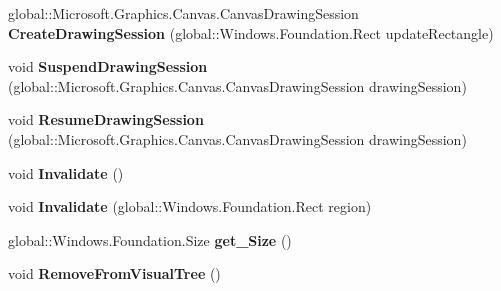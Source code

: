 \begin{DoxyCompactItemize}
global\+::\+Microsoft.\+Graphics.\+Canvas.\+Canvas\+Drawing\+Session {\bfseries Create\+Drawing\+Session} (global\+::\+Windows.\+Foundation.\+Rect update\+Rectangle)
\item 
\mbox{\label{class_microsoft_1_1_graphics_1_1_canvas_1_1_u_i_1_1_xaml_1_1_canvas_virtual_control_a67b34bbbcf4601ef850f26c26a0c3f54}} 
void {\bfseries Suspend\+Drawing\+Session} (global\+::\+Microsoft.\+Graphics.\+Canvas.\+Canvas\+Drawing\+Session drawing\+Session)
\item 
\mbox{\label{class_microsoft_1_1_graphics_1_1_canvas_1_1_u_i_1_1_xaml_1_1_canvas_virtual_control_a48ffbfafcaa20c4de29aee9bdec37dbd}} 
void {\bfseries Resume\+Drawing\+Session} (global\+::\+Microsoft.\+Graphics.\+Canvas.\+Canvas\+Drawing\+Session drawing\+Session)
\item 
\mbox{\label{class_microsoft_1_1_graphics_1_1_canvas_1_1_u_i_1_1_xaml_1_1_canvas_virtual_control_a091af64be3106bd03ef97245d58c8ef1}} 
void {\bfseries Invalidate} ()
\item 
\mbox{\label{class_microsoft_1_1_graphics_1_1_canvas_1_1_u_i_1_1_xaml_1_1_canvas_virtual_control_a14ac18c62a4e58078a3df49c2bd61e7d}} 
void {\bfseries Invalidate} (global\+::\+Windows.\+Foundation.\+Rect region)
\item 
\mbox{\label{class_microsoft_1_1_graphics_1_1_canvas_1_1_u_i_1_1_xaml_1_1_canvas_virtual_control_a43639e086b59c75cc4588187291b1539}} 
global\+::\+Windows.\+Foundation.\+Size {\bfseries get\+\_\+\+Size} ()
\item 
\mbox{\label{class_microsoft_1_1_graphics_1_1_canvas_1_1_u_i_1_1_xaml_1_1_canvas_virtual_control_aa905e71549d2ce0d69f0a79930bc36f7}} 
void {\bfseries Remove\+From\+Visual\+Tree} ()
\item 
\mbox{\label{class_microsoft_1_1_graphics_1_1_canvas_1_1_u_i_1_1_xaml_1_1_canvas_virtual_control_a3ed6271f1f8ed3b6eb4b6a05dd9e4b55}} 

\end{DoxyCompactItemize}

